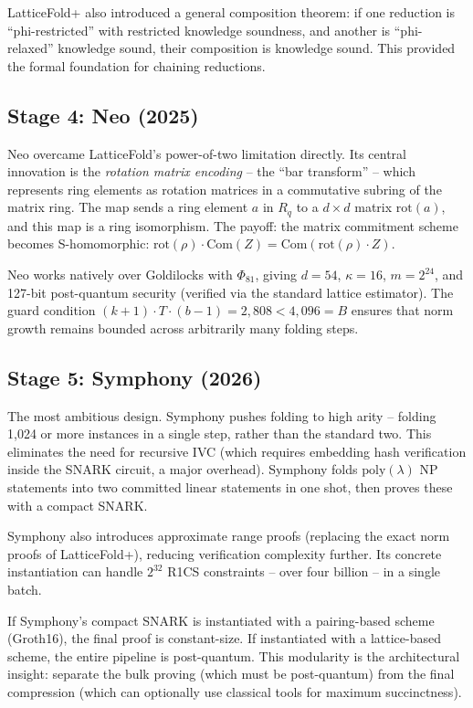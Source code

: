 \documentclass[
  11pt,
  openany]{report}
\begin{document}
LatticeFold+ also introduced a general composition theorem: if one reduction is
``phi-restricted'' with restricted knowledge soundness, and another is
``phi-relaxed'' knowledge sound, their composition is knowledge sound. This
provided the formal foundation for chaining reductions.

\subsection{Stage 4: Neo (2025)}\label{stage-4-neo-2025}

Neo overcame LatticeFold's power-of-two limitation directly. Its central
innovation is the \emph{rotation matrix encoding} -- the ``bar transform'' --
which represents ring elements as rotation matrices in a commutative subring of
the matrix ring. The map sends a ring element \(a\) in \(R_q\) to a
\(d \times d\) matrix \(\text{rot}(a)\), and this map is a ring isomorphism. The
payoff: the matrix commitment scheme becomes S-homomorphic:
\(\text{rot}(\rho) \cdot \text{Com}(Z) = \text{Com}(\text{rot}(\rho) \cdot Z)\).

Neo works natively over Goldilocks with \(\Phi_{81}\), giving \(d = 54\),
\(\kappa = 16\), \(m = 2^{24}\), and 127-bit post-quantum security (verified via
the standard lattice estimator). The guard condition
\((k+1) \cdot T \cdot (b-1) = 2{,}808 < 4{,}096 = B\) ensures that norm growth
remains bounded across arbitrarily many folding steps.

\subsection{Stage 5: Symphony (2026)}\label{stage-5-symphony-2026}

The most ambitious design. Symphony pushes folding to high arity -- folding
1,024 or more instances in a single step, rather than the standard two. This
eliminates the need for recursive IVC (which requires embedding hash
verification inside the SNARK circuit, a major overhead). Symphony folds
\(\text{poly}(\lambda)\) NP statements into two committed linear statements in
one shot, then proves these with a compact SNARK.

Symphony also introduces approximate range proofs (replacing the exact norm
proofs of LatticeFold+), reducing verification complexity further. Its concrete
instantiation can handle \(2^{32}\) R1CS constraints -- over four billion -- in
a single batch.

If Symphony's compact SNARK is instantiated with a pairing-based scheme
(Groth16), the final proof is constant-size. If instantiated with a
lattice-based scheme, the entire pipeline is post-quantum. This modularity is
the architectural insight: separate the bulk proving (which must be
post-quantum) from the final compression (which can optionally use classical
tools for maximum succinctness).
\end{document}
